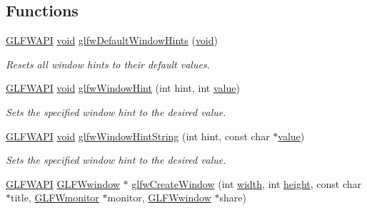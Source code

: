 \subsection*{Functions}
\begin{DoxyCompactItemize}
\item 
\mbox{\hyperlink{glfw3_8h_a56da5036b2cc259351ae22fd6439bb47}{G\+L\+F\+W\+A\+PI}} \mbox{\hyperlink{glad_8h_a950fc91edb4504f62f1c577bf4727c29}{void}} \mbox{\hyperlink{group__window_ga8050ddceed9dc6bd9d3aa35666195cd4}{glfw\+Default\+Window\+Hints}} (\mbox{\hyperlink{glad_8h_a950fc91edb4504f62f1c577bf4727c29}{void}})
\begin{DoxyCompactList}\small\item\em Resets all window hints to their default values. \end{DoxyCompactList}\item 
\mbox{\hyperlink{glfw3_8h_a56da5036b2cc259351ae22fd6439bb47}{G\+L\+F\+W\+A\+PI}} \mbox{\hyperlink{glad_8h_a950fc91edb4504f62f1c577bf4727c29}{void}} \mbox{\hyperlink{group__window_ga69c40728499720bef8a49aa925ea0efa}{glfw\+Window\+Hint}} (int hint, int \mbox{\hyperlink{glad_8h_a03aff08f73d7fde3d1a08e0abd8e84fa}{value}})
\begin{DoxyCompactList}\small\item\em Sets the specified window hint to the desired value. \end{DoxyCompactList}\item 
\mbox{\hyperlink{glfw3_8h_a56da5036b2cc259351ae22fd6439bb47}{G\+L\+F\+W\+A\+PI}} \mbox{\hyperlink{glad_8h_a950fc91edb4504f62f1c577bf4727c29}{void}} \mbox{\hyperlink{group__window_ga3c2270562d7ba13d92680ba1090adafe}{glfw\+Window\+Hint\+String}} (int hint, const char $\ast$\mbox{\hyperlink{glad_8h_a03aff08f73d7fde3d1a08e0abd8e84fa}{value}})
\begin{DoxyCompactList}\small\item\em Sets the specified window hint to the desired value. \end{DoxyCompactList}\item 
\mbox{\hyperlink{glfw3_8h_a56da5036b2cc259351ae22fd6439bb47}{G\+L\+F\+W\+A\+PI}} \mbox{\hyperlink{group__window_ga3c96d80d363e67d13a41b5d1821f3242}{G\+L\+F\+Wwindow}} $\ast$ \mbox{\hyperlink{group__window_ga680a02abe0e4494b6759d5703240713e}{glfw\+Create\+Window}} (int \mbox{\hyperlink{glad_8h_a09012ea95ebbbe1c032db7c68b54291e}{width}}, int \mbox{\hyperlink{glad_8h_a456943498a720df0f4b62bafa5dad93c}{height}}, const char $\ast$title, \mbox{\hyperlink{group__monitor_ga8d9efd1cde9426692c73fe40437d0ae3}{G\+L\+F\+Wmonitor}} $\ast$monitor, \mbox{\hyperlink{group__window_ga3c96d80d363e67d13a41b5d1821f3242}{G\+L\+F\+Wwindow}} $\ast$share)

\end{DoxyCompactItemize}
